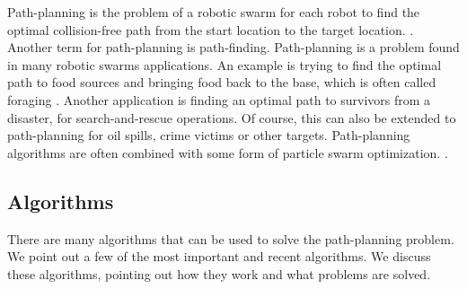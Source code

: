 
Path-planning is the problem of a robotic swarm for each robot to find the optimal collision-free path from the start location to the target location. \cite{qin2004path}.
Another term for path-planning is path-finding. 
Path-planning is a problem found in many robotic swarms applications.
An example is trying to find the optimal path to food sources and bringing food back to the base, which is often called foraging \cite{hoff2010two}.
Another application is finding an optimal path to survivors from a disaster, for search-and-rescue operations.
Of course, this can also be extended to path-planning for oil spills, crime victims or other targets.\cite{pugh2007inspiring} 
Path-planning algorithms are often combined with some form of particle swarm optimization. \cite{poli2007particle}.

\subsection{Algorithms}
There are many algorithms that can be used to solve the path-planning problem. 
We point out a few of the most important and recent algorithms. \cite{hoff2010two} \cite{bhattacharjee2011multi} \cite{jung2010multi} \cite{kala2012multi}
We discuss these algorithms, pointing out how they work and what problems are solved.


